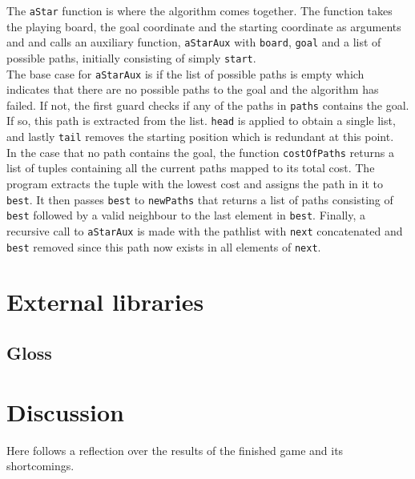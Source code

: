 \documentclass{article}
\begin{document}
 The \texttt{aStar} function is where the algorithm comes together. The function takes the playing board, the goal coordinate and the starting coordinate as arguments and and calls an auxiliary function, \texttt{aStarAux} with \texttt{board}, \texttt{goal} and a list of possible paths, initially consisting of simply \texttt{start}.\\
 \newline
 The base case for \texttt{aStarAux} is if the list of possible paths is empty which indicates that there are no possible paths to the goal and the algorithm has failed. If not, the first guard checks if any of the paths in \texttt{paths} contains the goal. If so, this path is extracted from the list. \texttt{head} is applied to obtain a single list, and lastly \texttt{tail} removes the starting position which is redundant at this point.\\
\newline
In the case that no path contains the goal, the function \texttt{costOfPaths} returns a list of tuples containing all the current paths mapped to its total cost. The program extracts the tuple with the lowest cost and assigns the path in it to \texttt{best}. It then passes \texttt{best} to \texttt{newPaths} that returns a list of paths consisting of \texttt{best} followed by a valid neighbour to the last element in \texttt{best}.
Finally, a recursive call to \texttt{aStarAux} is made with the pathlist with \texttt{next} concatenated and \texttt{best} removed since this path now exists in all elements of \texttt{next}.
\section{External libraries}
\subsection{Gloss}
\section{Discussion}
Here follows a reflection over the results of the finished game and its shortcomings.
\end{document}
